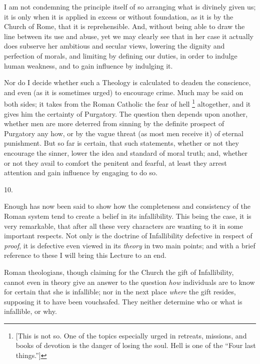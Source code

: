 I am not condemning the principle itself of so arranging what is
divinely given us; it is only when it is applied in excess or without
foundation, as it is by the Church of Rome, that it is reprehensible.
And, without being able to draw the line between its use and abuse,
yet we may clearly see that in her case it actually does subserve her
ambitious and secular views, lowering the dignity and perfection of
morals, and limiting by defining our duties, in order to indulge human
weakness, and to gain influence by indulging it.

Nor do I decide whether such a Theology is calculated to deaden the
conscience, and even (as it is sometimes urged) to encourage crime.
Much may be said on both sides; it takes from the Roman Catholic the
fear of hell \footnote{[This is not so. One of the topics
especially urged in retreats, missions, and books of devotion is the
danger of losing the soul. Hell is one of the ``Four last
things.'']} altogether,
and it gives him the certainty of Purgatory. The question then depends
upon another, whether men are more deterred from sinning by the
definite prospect of Purgatory any how, or by the vague threat (as
most men receive it) of eternal punishment. But so far is certain,
that such statements, whether or not they encourage the sinner,
lower the idea and standard of moral truth; and, whether or not they
avail to comfort the penitent and fearful, at least they arrest
attention and gain influence by engaging to do so.

10.

Enough has now been said to show how the completeness and
consistency of the Roman system tend to create a belief in its
infallibility. This being the case, it is very remarkable, that after
all these very characters are wanting to it in some important
respects. Not only is the doctrine of Infallibility defective in
respect of \emph{proof}, it is defective even viewed in its \emph{theory}
in two main points; and with a brief reference to these I will bring
this Lecture to an end.

Roman theologians, though claiming for the Church the gift of
Infallibility, cannot even in theory give an answer to the question \emph{how}
individuals are to know for certain that she is infallible; nor in the
next place \emph{where} the gift resides, supposing it to have been
vouchsafed. They neither determine who or what is infallible, or why.

